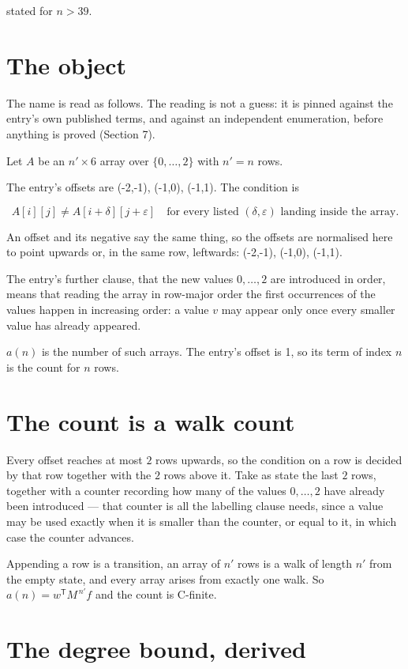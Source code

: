 \documentclass[11pt]{article}
\theoremstyle{definition}
\begin{document}
stated for $n > 39$.

\section{The object}

The name is read as follows. The reading is not a guess: it is pinned against the entry's own published terms, and against an independent enumeration, before anything is proved (Section 7).

Let $A$ be an $n' \times 6$ array over $\{0,\dots,2\}$ with $n' = n$ rows.

The entry's offsets are (-2,-1), (-1,0), (-1,1). The condition is

\[A[i][j] \ne A[i{+}\delta][j{+}\varepsilon]\quad\text{for every listed }(\delta,\varepsilon)\text{ landing inside the array.}\]

An offset and its negative say the same thing, so the offsets are normalised here to point upwards or, in the same row, leftwards: (-2,-1), (-1,0), (-1,1).

The entry's further clause, that the new values $0,\dots,2$ are introduced in order, means that reading the array in row-major order the first occurrences of the values happen in increasing order: a value $v$ may appear only once every smaller value has already appeared.

$a(n)$ is the number of such arrays. The entry's offset is 1, so its term of index $n$ is the count for $n$ rows.

\section{The count is a walk count}

Every offset reaches at most $2$ rows upwards, so the condition on a row is decided by that row together with the $2$ rows above it. Take as state the last $2$ rows, together with a counter recording how many of the values $0,\dots,2$ have already been introduced --- that counter is all the labelling clause needs, since a value may be used exactly when it is smaller than the counter, or equal to it, in which case the counter advances.

Appending a row is a transition, an array of $n'$ rows is a walk of length $n'$ from the empty state, and every array arises from exactly one walk. So $a(n) = w^{\mathsf T}M^{\,n'}f$ and the count is C-finite.

\section{The degree bound, derived}
\end{document}
